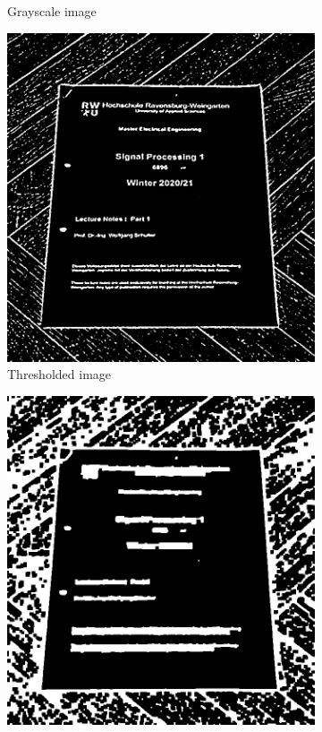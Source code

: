 \documentclass{scrartcl}
\begin{document}
\begin{figure}[!htbp]
\begin{subfigure}[b]{0.3\textwidth}
      \caption{Grayscale image}
    \end{subfigure}
    \begin{subfigure}[b]{0.3\textwidth}
      \centering
      \includegraphics[width=\textwidth]{pictures/results/wood1/threshold.png}
      \caption{Thresholded image}
    \end{subfigure}
    \vfill
    \begin{subfigure}[b]{0.3\textwidth}
      \centering
      \includegraphics[width=\textwidth]{pictures/results/wood1/morphology.png}

\end{subfigure}
\end{figure}
\end{document}
